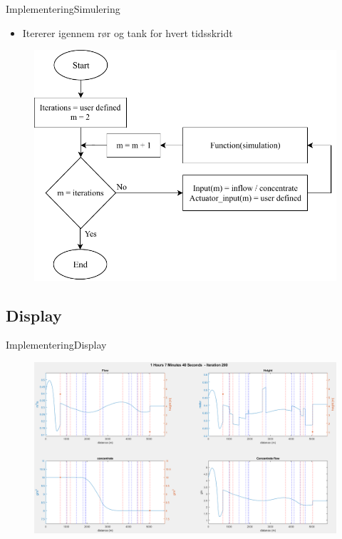 \begin{frame}{Implementering}{Simulering}
    \begin{itemize}
    	\item Itererer igennem rør og tank for hvert tidsskridt 
    \end{itemize}

    \begin{figure}[H]
\centering
\includegraphics[width=0.5 \textwidth]{figures/simu_main_chart.pdf}
\label{fig:simu_main_chart}
\end{figure}

\subsection{Display}
\end{frame}

\begin{frame}{Implementering}{Display}
     \begin{figure}[h]
 \centering
 \includegraphics[width=1.0 \textwidth]{figures/display_result_matlab.png}
 \label{fig:display_result_matlab}
 \end{figure}
\end{frame}


